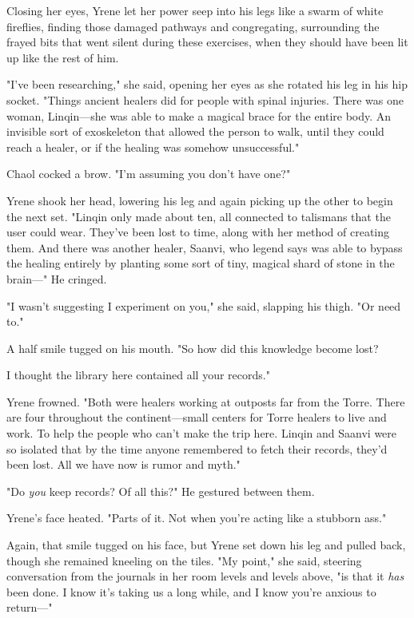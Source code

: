 Closing her eyes, Yrene let her power seep into his legs like a swarm of white fireflies, finding those damaged pathways and congregating, surrounding the frayed bits that went silent during these exercises, when they should have been lit up like the rest of him.

"I've been researching," she said, opening her eyes as she rotated his leg in his hip socket. "Things ancient healers did for people with spinal injuries. There was one woman, Linqin---she was able to make a magical brace for the entire body. An invisible sort of exoskeleton that allowed the person to walk, until they could reach a healer, or if the healing was somehow unsuccessful."

Chaol cocked a brow. "I'm assuming you don't have one?"

Yrene shook her head, lowering his leg and again picking up the other to begin the next set. "Linqin only made about ten, all connected to talismans that the user could wear. They've been lost to time, along with her method of creating them. And there was another healer, Saanvi, who legend says was able to bypass the healing entirely by planting some sort of tiny, magical shard of stone in the brain---" He cringed.

"I wasn't suggesting I experiment on you," she said, slapping his thigh. "Or need to."

A half smile tugged on his mouth. "So how did this knowledge become lost?

I thought the library here contained all your records."

Yrene frowned. "Both were healers working at outposts far from the Torre. There are four throughout the continent---small centers for Torre healers to live and work. To help the people who can't make the trip here. Linqin and Saanvi were so isolated that by the time anyone remembered to fetch their records, they'd been lost. All we have now is rumor and myth."

"Do \emph{you} keep records? Of all this?" He gestured between them.

Yrene's face heated. "Parts of it. Not when you're acting like a stubborn ass."

Again, that smile tugged on his face, but Yrene set down his leg and pulled back, though she remained kneeling on the tiles. "My point," she said, steering conversation from the journals in her room levels and levels above, "is that it \emph{has} been done. I know it's taking us a long while, and I know you're anxious to return---"

